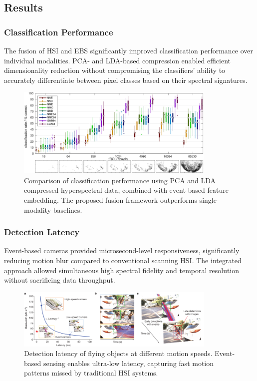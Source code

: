 \documentclass[conference]{IEEEtran}
\begin{document}
\subsection{Results}

\subsubsection{Classification Performance}
The fusion of HSI and EBS significantly improved classification performance over individual modalities. PCA- and LDA-based compression enabled efficient dimensionality reduction without compromising the classifiers’ ability to accurately differentiate between pixel classes based on their spectral signatures.

\begin{figure}[!t]
\centering
\includegraphics[width=0.85\textwidth]{PCA and LDA.png}
\caption{Comparison of classification performance using PCA and LDA compressed hyperspectral data, combined with event-based feature embedding. The proposed fusion framework outperforms single-modality baselines.}
\label{fig:classification_results}
\end{figure}

\subsubsection{Detection Latency}
Event-based cameras provided microsecond-level responsiveness, significantly reducing motion blur compared to conventional scanning HSI. The integrated approach allowed simultaneous high spectral fidelity and temporal resolution without sacrificing data throughput.

\begin{figure}[!t]
\centering
\includegraphics[width=0.85\textwidth]{Detextion_Latency.png}
\caption{Detection latency of flying objects at different motion speeds. Event-based sensing enables ultra-low latency, capturing fast motion patterns missed by traditional HSI systems.}
\label{fig:detection_latency}
\end{figure}
\end{document}
